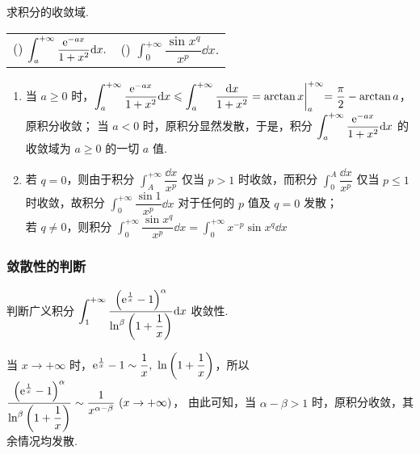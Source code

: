 \begin{example}
    求积分的收敛域.
    \setcounter{magicrownumbers}{0}
    \begin{table}[H]
        \centering
        \begin{tabular}{l | l}
            (\rownumber{}) $\displaystyle\int_{a}^{+\infty}\dfrac{\mathrm{e} ^{-ax}}{1+x^2}\dd x.$ & (\rownumber{}) $\displaystyle\int_{0}^{+\infty}\dfrac{\sin x^q}{x^p}\dd x.$
        \end{tabular}
    \end{table}
\end{example}
\begin{solution}
    \begin{enumerate}[label=(\arabic{*})]
        \item 当 $a\geqslant 0$ 时，$\displaystyle \int_{a}^{+\infty}\dfrac{\mathrm{e} ^{-ax}}{1+x^2}\dd x\leqslant \int_{a}^{+\infty}\dfrac{\dd x}{1+x^2}=\arctan x\biggl |_a^{+\infty}=\dfrac{\pi}{2}-\arctan a$，原积分收敛；
              当 $a<0$ 时，原积分显然发散，于是，积分 $\displaystyle\int_{a}^{+\infty}\dfrac{\mathrm{e} ^{-ax}}{1+x^2}\dd x$ 的收敛域为 $a\geqslant 0$ 的一切 $a$ 值.
        \item 若 $q=0$，则由于积分 $\displaystyle\int_{A}^{+\infty}\dfrac{\dd x}{x^p}$ 仅当 $p>1$ 时收敛，而积分 $\displaystyle\int_{0}^{A}\dfrac{\dd x}{x^p}$ 仅当 $p\leqslant1$ 时收敛，故积分
              $\displaystyle\int_{0}^{+\infty}\dfrac{\sin 1}{x^p}\dd x$ 对于任何的 $p$ 值及 $q=0$ 发散；\\
              若 $q\neq 0$，则积分 $\displaystyle\int_{0}^{+\infty}\dfrac{\sin x^q}{x^p}\dd x=\int_{0}^{+\infty}x^{-p}\sin x^q\dd x$
    \end{enumerate}
\end{solution}

\subsubsection{敛散性的判断}

\begin{example}
    判断广义积分 $\displaystyle\int_{1}^{+\infty}\dfrac{\qty(\mathrm{e} ^{\frac{1}{x}}-1)^\alpha}{\ln^\beta \qty(1+\dfrac{1}{x})}\dd x$ 收敛性.
\end{example}
\begin{solution}
    当 $x\to+\infty $ 时，$\mathrm{e} ^{\frac{1}{x}}-1\sim \dfrac{1}{x},~\ln\qty(1+\dfrac{1}{x})$，所以 $\displaystyle \dfrac{\qty(\mathrm{e} ^{\frac{1}{x}}-1)^\alpha}{\ln^\beta \qty(1+\dfrac{1}{x})}\sim \dfrac{1}{x^{\alpha-\beta}}~  (x\to+\infty)$，
    由此可知，当 $\alpha-\beta>1$ 时，原积分收敛，其余情况均发散.
\end{solution}

